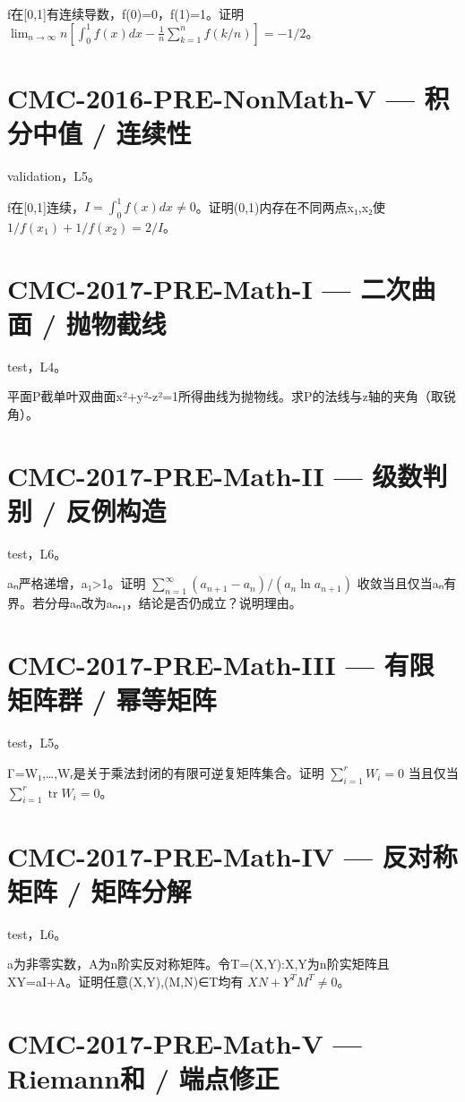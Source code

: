 \documentclass[UTF8]{ctexart}
\begin{document}
f在[0,1]有连续导数，f(0)=0，f(1)=1。证明 $\lim_{n\to\infty}n[\int_0^1f(x)dx-\frac1n\sum_{k=1}^nf(k/n)]=-1/2$。

\section*{CMC-2016-PRE-NonMath-V — 积分中值 / 连续性}

validation，L5。

f在[0,1]连续，$I=\int_0^1 f(x)dx\ne0$。证明(0,1)内存在不同两点x₁,x₂使 $1/f(x_1)+1/f(x_2)=2/I$。

\section*{CMC-2017-PRE-Math-I — 二次曲面 / 抛物截线}

test，L4。

平面P截单叶双曲面x²+y²-z²=1所得曲线为抛物线。求P的法线与z轴的夹角（取锐角）。

\section*{CMC-2017-PRE-Math-II — 级数判别 / 反例构造}

test，L6。

aₙ严格递增，a₁>1。证明 $\sum_{n=1}^\infty(a_{n+1}-a_n)/(a_n\ln a_{n+1})$ 收敛当且仅当aₙ有界。若分母aₙ改为aₙ₊₁，结论是否仍成立？说明理由。

\section*{CMC-2017-PRE-Math-III — 有限矩阵群 / 幂等矩阵}

test，L5。

Γ={W₁,…,Wᵣ}是关于乘法封闭的有限可逆复矩阵集合。证明 $\sum_{i=1}^rW_i=0$ 当且仅当 $\sum_{i=1}^r\operatorname{tr}W_i=0$。

\section*{CMC-2017-PRE-Math-IV — 反对称矩阵 / 矩阵分解}

test，L6。

a为非零实数，A为n阶实反对称矩阵。令T={(X,Y):X,Y为n阶实矩阵且XY=aI+A}。证明任意(X,Y),(M,N)∈T均有 $XN+Y^TM^T\ne0$。

\section*{CMC-2017-PRE-Math-V — Riemann和 / 端点修正}
\end{document}
